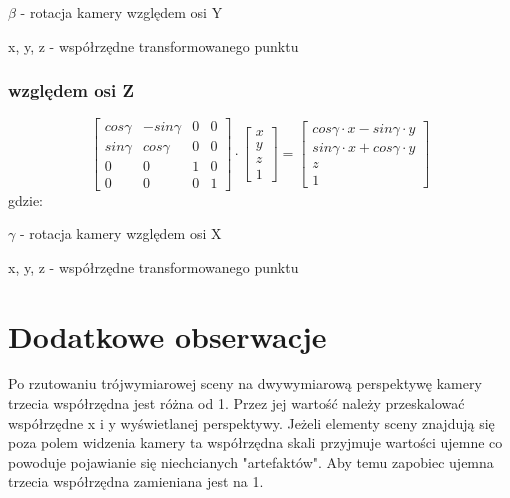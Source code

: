 \documentclass[11pt]{article}
\begin{document}
$\beta$ - rotacja kamery względem osi Y

x, y, z - współrzędne transformowanego punktu

\subsubsection{względem osi Z}
\begin{equation}
    \begin{bmatrix}
        cos \gamma & -sin \gamma & 0 & 0\\
        sin \gamma & cos \gamma & 0 & 0\\
        0 & 0 & 1 & 0\\
        0 & 0 & 0 & 1
    \end{bmatrix}
    \cdot
    \begin{bmatrix}
        x\\
        y\\
        z\\
        1
    \end{bmatrix}
    =
    \begin{bmatrix}
        cos \gamma \cdot x - sin \gamma \cdot y\\
        sin \gamma \cdot x + cos \gamma \cdot y\\
        z\\
        1
    \end{bmatrix}
\end{equation}
gdzie:

$\gamma$ - rotacja kamery względem osi X

x, y, z - współrzędne transformowanego punktu

\section{Dodatkowe obserwacje}
Po rzutowaniu trójwymiarowej sceny na dwywymiarową perspektywę kamery trzecia współrzędna 
jest różna od 1. Przez jej wartość należy przeskalować współrzędne x i y wyświetlanej 
perspektywy.
Jeżeli elementy sceny znajdują się poza polem widzenia kamery ta współrzędna skali przyjmuje wartości ujemne
co powoduje pojawianie się niechcianych "artefaktów". Aby temu zapobiec ujemna trzecia współrzędna
zamieniana jest na 1.
\end{document}
